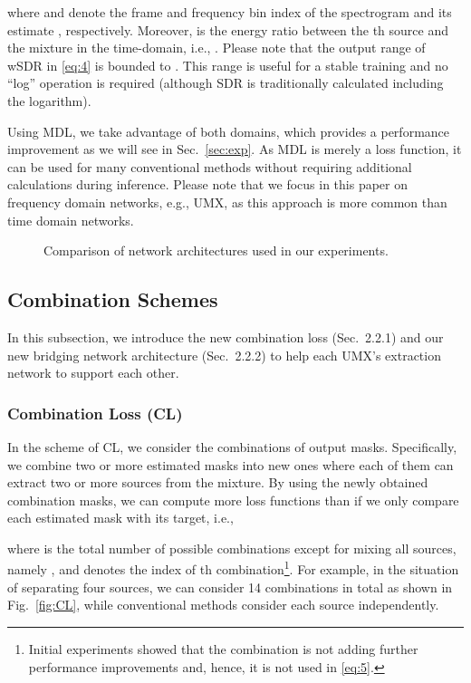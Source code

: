 \documentclass{article}
\begin{document}
where  and  denote the frame and frequency bin index of the spectrogram  and its estimate , respectively.
Moreover,  is the energy ratio between the th source  and the mixture  in the time-domain, i.e., .
Please note that the output range of wSDR in \eqref{eq:4} is bounded to . This range is useful for a stable training and no ``log'' operation is required (although SDR is traditionally calculated including the logarithm).

Using MDL, we take advantage of both domains, which provides a performance improvement as we will see in Sec.~\ref{sec:exp}. 
As MDL is merely a loss function, it can be used for many conventional methods without requiring additional calculations during inference. 
Please note that we focus in this paper on frequency domain networks, e.g., UMX, as this approach is more common than time domain networks.

\begin{figure*}[t]
\centering
{}
\hspace{+3mm}


\caption{Comparison of network architectures used in our experiments.}
  \label{fig:comp_archi}
  \vspace{-3mm}
\end{figure*}

\subsection{Combination Schemes}
\label{subsec:combi}
In this subsection, we introduce the new combination loss (Sec.~2.2.1) and our new bridging network architecture (Sec.~2.2.2) to help each UMX's extraction network to support each other.

\subsubsection{Combination Loss (CL)}
\label{subsec:CL}
In the scheme of CL, we consider the combinations of output masks.
Specifically, we combine two or more estimated masks into new ones where each of them can extract two or more sources from the mixture.
By using the newly obtained combination masks, we can compute more loss functions than if we only compare each estimated mask with its target, i.e.,

where  is the total number of possible combinations except for mixing all  sources, namely , and  denotes the index of th combination\footnote{Initial experiments showed that the combination  is not adding further performance improvements and, hence, it is not used in \eqref{eq:5}.}.
For example, in the situation of separating four sources, we can consider 14  combinations in total as shown in Fig.~\ref{fig:CL}, 
while conventional methods consider each source independently.
\end{document}

